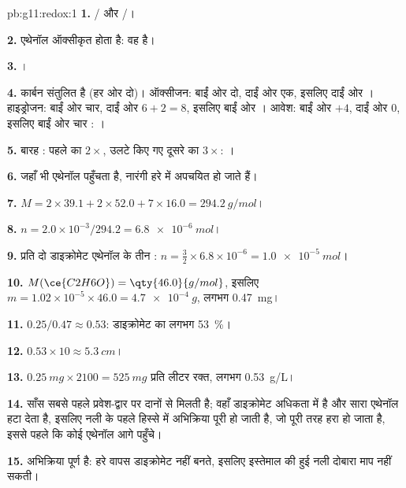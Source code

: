 \begin{solution}{pb:g11:redox:1}
\textbf{1.} / और /।

\textbf{2.} एथेनॉल ऑक्सीकृत होता है: वह  है।

\textbf{3.} ।

\textbf{4.} कार्बन संतुलित है (हर ओर दो)। ऑक्सीजन: बाईं ओर दो,
दाईं ओर एक, इसलिए दाईं ओर । हाइड्रोजन: बाईं ओर चार,
दाईं ओर $6 + 2 = 8$, इसलिए बाईं ओर । आवेश: बाईं ओर $+4$,
दाईं ओर 0, इसलिए बाईं ओर चार :
।

\textbf{5.} बारह : पहले का $2\times$, उलटे किए गए दूसरे का
$3\times$:
।

\textbf{6.} जहाँ भी एथेनॉल पहुँचता है, नारंगी   हरे
  में अपचयित हो जाते हैं।

\textbf{7.} $M = 2\times 39.1 + 2\times 52.0 + 7\times 16.0 =
\qty{294.2}{g/mol}$।

\textbf{8.} $n = 2.0\times 10^{-3}/294.2 = \qty{6.8e-6}{mol}$।

\textbf{9.} प्रति दो डाइक्रोमेट  एथेनॉल के तीन :
$n = \tfrac{3}{2}\times 6.8\times 10^{-6} = \qty{1.0e-5}{mol}$।

\textbf{10.} $M(\ce{C2H6O}) = \qty{46.0}{g/mol}$, इसलिए
$m = 1.02\times 10^{-5}\times 46.0 = \qty{4.7e-4}{g}$, लगभग
\qty{0.47}{mg}।

\textbf{11.} $0.25/0.47 \approx 0.53$: डाइक्रोमेट का लगभग
\qty{53}{\percent}।

\textbf{12.} $0.53 \times 10 \approx \qty{5.3}{cm}$।

\textbf{13.} $\qty{0.25}{mg} \times 2100 = \qty{525}{mg}$ प्रति लीटर
रक्त, लगभग \qty{0.53}{g/L}।

\textbf{14.} साँस सबसे पहले प्रवेश-द्वार पर दानों से मिलती है; वहाँ
डाइक्रोमेट अधिकता में है और सारा एथेनॉल हटा देता है, इसलिए
नली के पहले हिस्से में अभिक्रिया पूरी हो जाती है, जो पूरी तरह
हरा हो जाता है, इससे पहले कि कोई एथेनॉल आगे पहुँचे।

\textbf{15.} अभिक्रिया पूर्ण है: हरे   वापस
डाइक्रोमेट नहीं बनते, इसलिए इस्तेमाल की हुई नली दोबारा माप नहीं सकती।


\end{solution}
